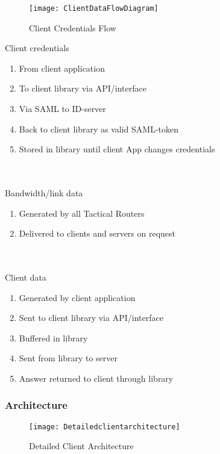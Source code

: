     \begin{figure}[h]
        \centering
        \texttt{[image: ClientDataFlowDiagram]}
        \caption{Client Credentials Flow}
        \label{fig:ClientDataFlowDiagram}
    \end{figure}
    
		Client credentials
		\begin{enumerate}
			\item From client application
			\item To client library via API/interface
			\item Via SAML to ID-server
			\item Back to client library as valid SAML-token
			\item Stored in library until client App changes credentials
		\end{enumerate}
		\\\\
		Bandwidth/link data
		\begin{enumerate}
			\item Generated by all Tactical Routers
			\item Delivered to clients and servers on request
		\end{enumerate}
		\\\\
		Client data
		\begin{enumerate}
			\item Generated by client application
			\item Sent to client library via API/interface
			\item Buffered in library
			\item Sent from library to server
			\item Answer returned to client through library
		\end{enumerate}
		
	\subsubsection{Architecture}\label{Client Architecture}
		\begin{figure}[h]
			\centering	
			\texttt{[image: Detailedclientarchitecture]}
			\caption{Detailed Client Architecture}
			\label{fig:DetailedClientArchitecture}
		\end{figure}

